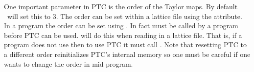 One important parameter in PTC is the order of the Taylor maps.
By default \bmad\ will set this to 3. The order can be set within
a lattice file using the  attribute.
In a program the order can be set using . In fact
 must be called by a program before PTC can be used.
 will do this when reading in a lattice file.
That is, if a program does not use  then to use PTC it
must call . Note that resetting PTC to a different order
reinitializes PTC's internal memory so one must be careful if one wants
to change the order in mid program.




